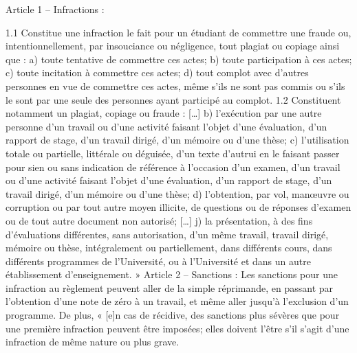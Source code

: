 \documentclass [12 pt]{article}
\begin{document}
                
                    Article 1 – Infractions :
                
                1.1 Constitue une infraction le fait pour un
                    étudiant de commettre une fraude ou, intentionnellement, par insouciance ou
                    négligence, tout plagiat ou copiage ainsi que :
                a) toute tentative de commettre ces actes;
                b) toute participation à ces actes;
                c) toute incitation à commettre ces actes;
                d) tout complot avec d'autres personnes en vue de
                    commettre ces actes, même s'ils ne sont pas commis ou s'ils le sont par une
                    seule des personnes ayant participé au complot.
                1.2 Constituent notamment un plagiat, copiage ou
                    fraude :
                […]
                b) l'exécution par une autre personne d'un travail
                    ou d'une activité faisant l'objet d'une évaluation, d'un rapport de stage, d'un
                    travail dirigé, d'un mémoire ou d'une thèse;
                c) l'utilisation totale ou partielle, littérale ou
                    déguisée, d'un texte d'autrui en le faisant passer pour sien ou sans indication
                    de référence à l'occasion d'un examen, d'un travail ou d'une activité faisant
                    l'objet d'une évaluation, d'un rapport de stage, d'un travail dirigé, d'un
                    mémoire ou d'une thèse;
                d) l'obtention, par vol, manœuvre ou corruption ou
                    par tout autre moyen illicite, de questions ou de réponses d'examen ou de tout
                    autre document non autorisé;
                […]
                j) la présentation, à des fins d'évaluations
                    différentes, sans autorisation, d'un même travail, travail dirigé, mémoire ou
                    thèse, intégralement ou partiellement, dans différents cours, dans différents
                    programmes de l'Université, ou à l'Université et dans un autre établissement
                    d'enseignement. »
                Article 2 – Sanctions : Les sanctions pour une infraction au règlement
                    peuvent aller de la simple réprimande, en passant par l'obtention d'une note de
                    zéro à un travail, et même aller jusqu'à l'exclusion d'un programme. De plus, «
                    [e]n cas de récidive, des sanctions plus sévères que pour une première
                    infraction peuvent être imposées; elles doivent l'être s'il s'agit d'une
                    infraction de même nature ou plus grave.
            
\end{document}
